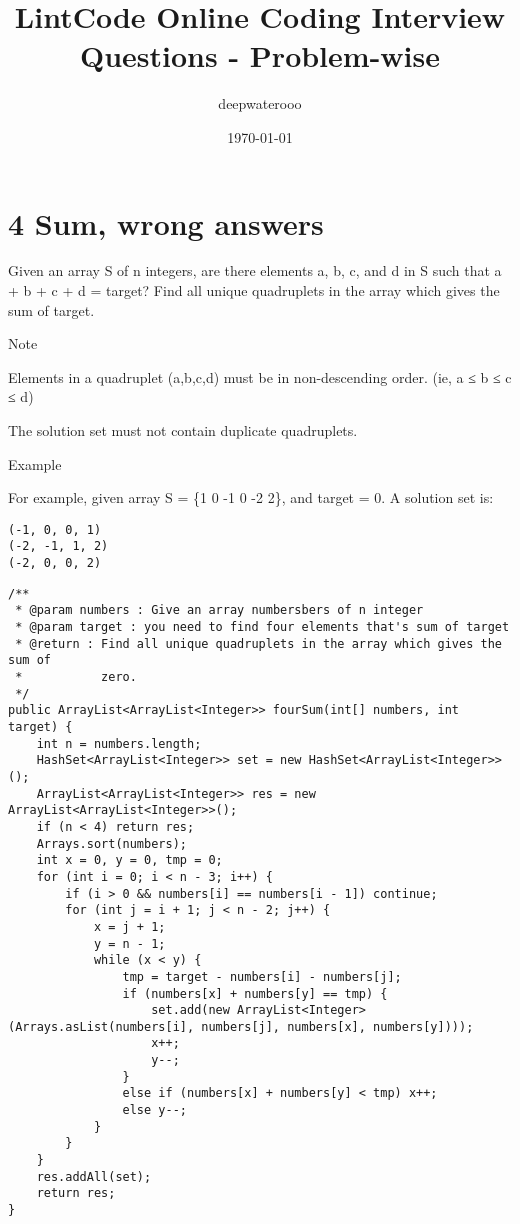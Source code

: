 \documentclass[12pt]{book}
\author{deepwaterooo}
\date{\today}
\title{LintCode Online Coding Interview Questions - Problem-wise}
\begin{document}
\maketitle
\tableofcontents


\chapter{4 Sum, wrong answers}
\label{sec-1}

Given an array S of n integers, are there elements a, b, c, and d in S such that a + b + c + d = target? Find all unique quadruplets in the array which gives the sum of target.

Note

Elements in a quadruplet (a,b,c,d) must be in non-descending order. (ie, a ≤ b ≤ c ≤ d)

The solution set must not contain duplicate quadruplets.

Example

For example, given array S = \{1 0 -1 0 -2 2\}, and target = 0. A solution set is:
\lstset{language=java,label= ,caption= ,numbers=none}
\begin{lstlisting}
(-1, 0, 0, 1)
(-2, -1, 1, 2)
(-2, 0, 0, 2)
\end{lstlisting}
\lstset{language=java,label= ,caption= ,numbers=none}
\begin{lstlisting}
/**
 * @param numbers : Give an array numbersbers of n integer
 * @param target : you need to find four elements that's sum of target
 * @return : Find all unique quadruplets in the array which gives the sum of
 *           zero.
 */
public ArrayList<ArrayList<Integer>> fourSum(int[] numbers, int target) {     
    int n = numbers.length;
    HashSet<ArrayList<Integer>> set = new HashSet<ArrayList<Integer>>();
    ArrayList<ArrayList<Integer>> res = new ArrayList<ArrayList<Integer>>();
    if (n < 4) return res;
    Arrays.sort(numbers);
    int x = 0, y = 0, tmp = 0;
    for (int i = 0; i < n - 3; i++) {
        if (i > 0 && numbers[i] == numbers[i - 1]) continue;
        for (int j = i + 1; j < n - 2; j++) {
            x = j + 1;
            y = n - 1;
            while (x < y) {
                tmp = target - numbers[i] - numbers[j];
                if (numbers[x] + numbers[y] == tmp) {
                    set.add(new ArrayList<Integer>(Arrays.asList(numbers[i], numbers[j], numbers[x], numbers[y])));
                    x++;
                    y--;
                }
                else if (numbers[x] + numbers[y] < tmp) x++;
                else y--;
            }
        }
    }
    res.addAll(set);
    return res;
}
\end{lstlisting}
\end{document}
